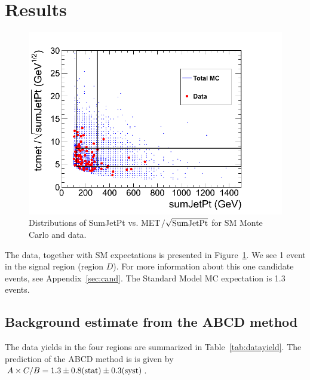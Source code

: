 
\section{Results}
\label{sec:results}

\begin{figure}[tbh]
\begin{center}
\includegraphics[width=0.75\linewidth]{abcd_jsonv3.png}
\caption{\label{fig:abcdData}\protect Distributions of SumJetPt 
vs. MET$/\sqrt{\rm SumJetPt}$ for SM Monte Carlo and data.}
\end{center}
\end{figure}

The data, together with SM expectations is presented 
in Figure~\ref{fig:abcdData}.  We see 1 event in the 
signal region (region $D$).  For more information about
this one candidate events, see Appendix~\ref{sec:cand}.
The Standard Model MC expectation is 1.3 events.

\subsection{Background estimate from the ABCD method}
\label{sec:abcdres}

The data yields in the 
four regions are summarized in Table~\ref{tab:datayield}.
The prediction of the ABCD method is is given by $A \times C / B = 1.3 \pm 0.8({\rm stat}) \pm 0.3({\rm syst})$.

